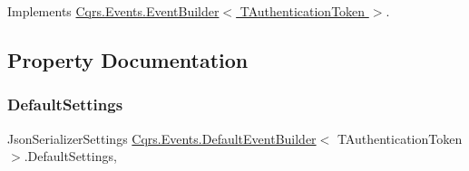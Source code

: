 Implements \hyperlink{classCqrs_1_1Events_1_1EventBuilder_aefa7bfaea90123e143e108d46efc6603}{Cqrs.\+Events.\+Event\+Builder$<$ T\+Authentication\+Token $>$}.



\subsection{Property Documentation}
\mbox{\label{classCqrs_1_1Events_1_1DefaultEventBuilder_aabead59863bacfed527d85ea789ab881}} 
\subsubsection{\texorpdfstring{Default\+Settings}{DefaultSettings}}
{\footnotesize\ttfamily Json\+Serializer\+Settings \hyperlink{classCqrs_1_1Events_1_1DefaultEventBuilder}{Cqrs.\+Events.\+Default\+Event\+Builder}$<$ T\+Authentication\+Token $>$.Default\+Settings\hspace{0.3cm}{\ttfamily [static]}, {\ttfamily [get]}}


